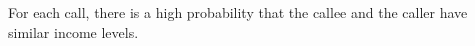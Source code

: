 For each call, there is a high probability that the callee and the caller have similar income levels.